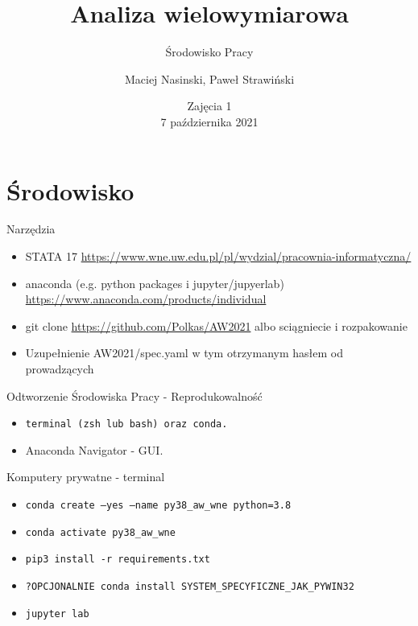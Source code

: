 \documentclass{beamer}
\begin{document}
\begin{frame}
\title[Tytuł]{Analiza wielowymiarowa}
\subtitle{Środowisko Pracy}
\author{Maciej Nasinski, Paweł Strawiński}
\date{Zajęcia 1 \\ 7 października 2021}
\titlepage
\end{frame}

\section{Środowisko}

\begin{frame}{Narzędzia}
  \begin{itemize}
  \item STATA 17 \url{https://www.wne.uw.edu.pl/pl/wydzial/pracownia-informatyczna/}
  \item anaconda (e.g. python packages i jupyter/jupyerlab) \url{https://www.anaconda.com/products/individual}
  \item git clone \url{https://github.com/Polkas/AW2021} albo sciągniecie i rozpakowanie
  \item Uzupełnienie AW2021/spec.yaml w tym otrzymanym hasłem od prowadzących
  \end{itemize}
\end{frame}

\begin{frame}{Odtworzenie Środowiska Pracy - Reprodukowalność}
  \begin{itemize}
  \item \texttt{terminal (zsh lub bash) oraz conda.}
  \item Anaconda Navigator - GUI.
  \end{itemize}
\end{frame}

\begin{frame}{Komputery prywatne - terminal}
  \begin{itemize}
  \item \texttt{conda create --yes --name py38\_aw\_wne python=3.8} 
  \item \texttt{conda activate py38\_aw\_wne}
  \item \texttt{pip3 install -r requirements.txt}
  \item \texttt{?OPCJONALNIE conda install SYSTEM\_SPECYFICZNE\_JAK\_PYWIN32}
  \item \texttt{jupyter lab}
  \end{itemize}
\end{frame}
\end{document}
